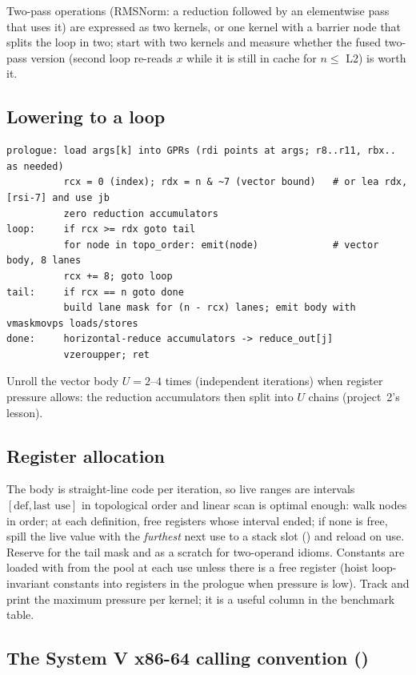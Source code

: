 Two-pass operations (RMSNorm: a reduction followed by an elementwise pass that uses it) are expressed as two kernels, or one kernel with a  barrier node that splits the loop in two; start with two kernels and measure whether the fused two-pass version (second loop re-reads $x$ while it is still in cache for $n \le$ L2) is worth it.

\subsection{Lowering to a loop}

\begin{lstlisting}[style=plain]
prologue: load args[k] into GPRs (rdi points at args; r8..r11, rbx.. as needed)
          rcx = 0 (index); rdx = n & ~7 (vector bound)   # or lea rdx, [rsi-7] and use jb
          zero reduction accumulators
loop:     if rcx >= rdx goto tail
          for node in topo_order: emit(node)             # vector body, 8 lanes
          rcx += 8; goto loop
tail:     if rcx == n goto done
          build lane mask for (n - rcx) lanes; emit body with vmaskmovps loads/stores
done:     horizontal-reduce accumulators -> reduce_out[j]
          vzeroupper; ret
\end{lstlisting}
Unroll the vector body $U=2$--$4$ times (independent iterations) when register pressure allows: the reduction accumulators then split into $U$ chains (project~2's lesson).

\subsection{Register allocation}

The body is straight-line code per iteration, so live ranges are intervals $[\text{def}, \text{last use}]$ in topological order and linear scan is optimal enough: walk nodes in order; at each definition, free registers whose interval ended; if none is free, spill the live value with the \emph{furthest} next use to a stack slot () and reload on use. Reserve  for the tail mask and  as a scratch for two-operand idioms. Constants are loaded with  from the pool at each use unless there is a free register (hoist loop-invariant constants into registers in the prologue when pressure is low). Track and print the maximum pressure per kernel; it is a useful column in the benchmark table.

\subsection{The System V x86-64 calling convention ()}

